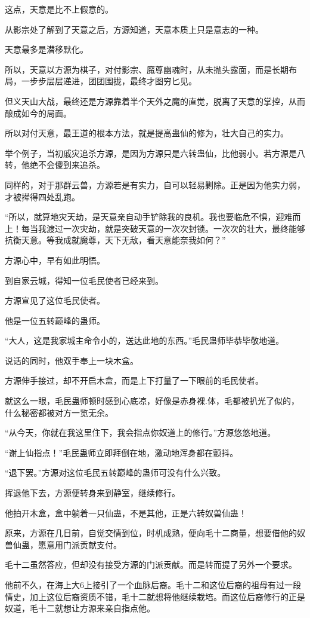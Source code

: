 \begin{this_body}
这点，天意是比不上假意的。

从影宗处了解到了天意之后，方源知道，天意本质上只是意志的一种。

天意最多是潜移默化。

所以，天意以方源为棋子，对付影宗、魔尊幽魂时，从未抛头露面，而是长期布局，一步步层层递进，团团围拢，最终才图穷匕见。

但义天山大战，最终还是方源靠着半个天外之魔的直觉，脱离了天意的掌控，从而酿成如今的局面。

所以对付天意，最王道的根本方法，就是提高蛊仙的修为，壮大自己的实力。

举个例子，当初戚灾追杀方源，是因为方源只是六转蛊仙，比他弱小。若方源是八转，他绝不会傻到来追杀。

同样的，对于那群云兽，方源若是有实力，自可以轻易剿除。正是因为他实力弱，才被撵得四处乱跑。

“所以，就算地灾天劫，是天意亲自动手铲除我的良机。我也要临危不惧，迎难而上！每当我渡过一次灾劫，就是突破天意的一次次封锁。一次次的壮大，最终能够抗衡天意。等我成就魔尊，天下无敌，看天意能奈我如何？”

方源心中，早有如此明悟。

到自家云城，得知一位毛民使者已经来到。

方源宣见了这位毛民使者。

他是一位五转巅峰的蛊师。

“大人，这是我家城主命令小的，送达此地的东西。”毛民蛊师毕恭毕敬地道。

说话的同时，他双手奉上一块木盒。

方源伸手接过，却不开启木盒，而是上下打量了一下眼前的毛民使者。

就这么一眼，毛民蛊师顿时感到心底凉，好像是赤身裸.体，毛都被扒光了似的，什么秘密都被对方一览无余。

“从今天，你就在我这里住下，我会指点你奴道上的修行。”方源悠悠地道。

“谢上仙指点！”毛民蛊师立即拜倒在地，激动地浑身都在颤抖。

“退下罢。”方源对这位毛民五转巅峰的蛊师可没有什么兴致。

挥退他下去，方源便转身来到静室，继续修行。

他拍开木盒，盒中躺着一只仙蛊，不是其他，正是六转奴兽仙蛊！

原来，方源在几日前，自觉交情到位，时机成熟，便向毛十二商量，想要借他的奴兽仙蛊，愿意用门派贡献支付。

毛十二虽然答应，但却没有接受方源的门派贡献。而是转而提了另外一个要求。

他前不久，在海上大6上接引了一个血脉后裔。毛十二和这位后裔的祖母有过一段情史，加上这位后裔资质不错，毛十二就想将他继续栽培。而这位后裔修行的正是奴道，毛十二就想让方源来亲自指点他。


\end{this_body}
